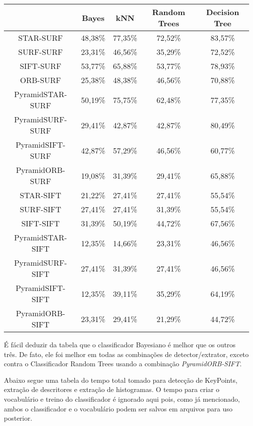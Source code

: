 \documentclass[a4paper,11pt]{article}
\begin{document}
  \vspace{15pt}
  \hspace{-25pt}
  \begin{tabular}{|c|c|c|c|c|}
    \hline
     & Bayes & kNN & Random Trees & Decision Tree \\
    \hline
        STAR-SURF & 48,38\% & 77,35\% & 72,52\% & 83,57\% \\
        SURF-SURF & 23,31\% & 46,56\% & 35,29\% & 72,52\% \\
        SIFT-SURF & 53,77\% & 65,88\% & 53,77\% & 78,93\%\\
        ORB-SURF & 25,38\% & 48,38\% & 46,56\% & 70,88\% \\
        PyramidSTAR-SURF & 50,19\% & 75,75\% & 62,48\% & 77,35\% \\
        PyramidSURF-SURF & 29,41\% & 42,87\% & 42,87\% & 80,49\% \\
        PyramidSIFT-SURF & 42,87\% & 57,29\% & 46,56\% & 60,77\% \\
        PyramidORB-SURF & 19,08\% & 31,39\% & 29,41\% & 65,88\% \\
        STAR-SIFT & 21,22\% & 27,41\% & 27,41\% & 55,54\% \\
        SURF-SIFT & 27,41\% & 27,41\% & 31,39\% & 55,54\% \\
        SIFT-SIFT & 31,39\% & 50,19\% & 44,72\% & 67,56\% \\
        PyramidSTAR-SIFT & 12,35\% & 14,66\% & 23,31\% & 46,56\% \\
        PyramidSURF-SIFT & 27,41\% & 31,39\% & 27,41\% & 46,56\% \\
        PyramidSIFT-SIFT & 12,35\% & 39,11\% & 35,29\% & 64,19\% \\
        PyramidORB-SIFT & 23,31\% & 29,41\% & 21,29\% & 44,72\% \\
        
    \hline
  \end{tabular}
  \bigskip

  É fácil deduzir da tabela que o classificador Bayesiano é melhor que os outros
  três. De fato, ele foi melhor em todas as combinações de detector/extrator,
  exceto contra o Classificador Random Trees usando a combinação
  \textit{PyramidORB-SIFT}.

  Abaixo segue uma tabela do tempo total tomado para detecção de KeyPoints,
  extração de descritores e extração de histogramas. O tempo para criar o
  vocabulário e treino do classificador é ignorado aqui pois, como já
  mencionado, ambos o classificador e o vocabulário podem ser salvos em arquivos
  para uso posterior.
\end{document}
